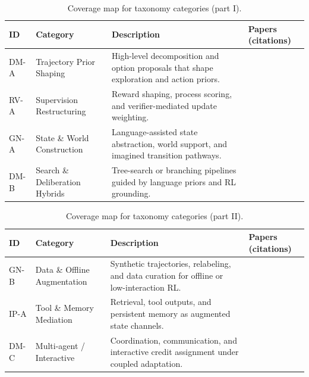 \documentclass[pdflatex,sn-mathphys-num]{sn-jnl}
\begin{document}
\begin{table}[t]
\centering
\footnotesize
\setlength{\tabcolsep}{4pt}
\renewcommand{\arraystretch}{1.05}
\begin{tabularx}{\textwidth}{P{1.1cm}P{2.6cm}P{3.4cm}Y}
\toprule
\textbf{ID} & \textbf{Category} & \textbf{Description} & \textbf{Papers (citations)}\\
\midrule
DM-A & Trajectory Prior Shaping & High-level decomposition and option proposals that shape exploration and action priors. & \cite{arxiv_p_2204_01691,arxiv_p_2305_16291,arxiv_p_2405_01534,arxiv_p_2512_12716,arxiv_p_2601_14140}\\
RV-A & Supervision Restructuring & Reward shaping, process scoring, and verifier-mediated update weighting. & \cite{arxiv_p_2310_12931,arxiv_p_2510_20867,arxiv_p_2602_12579}\\
GN-A & State \& World Construction & Language-assisted state abstraction, world support, and imagined transition pathways. & \cite{arxiv_p_2301_12050,arxiv_p_2303_16563,arxiv_p_2602_02454,arxiv_p_2602_11075,arxiv_p_2602_16165}\\
DM-B & Search \& Deliberation Hybrids & Tree-search or branching pipelines guided by language priors and RL grounding. & \cite{arxiv_p_2602_03719,arxiv_p_2602_06493,arxiv_p_2602_07848,doi_p_10_48448_q4pk_2g71}\\
\bottomrule
\end{tabularx}
\caption{Coverage map for taxonomy categories (part I).}
\label{tab:coverage_map_part1}
\end{table}

\begin{table}[t]
\centering
\footnotesize
\setlength{\tabcolsep}{4pt}
\renewcommand{\arraystretch}{1.05}
\begin{tabularx}{\textwidth}{P{1.1cm}P{2.6cm}P{3.4cm}Y}
\toprule
\textbf{ID} & \textbf{Category} & \textbf{Description} & \textbf{Papers (citations)}\\
\midrule
GN-B & Data \& Offline Augmentation & Synthetic trajectories, relabeling, and data curation for offline or low-interaction RL. & \cite{arxiv_p_2310_20587,arxiv_p_2505_18098,arxiv_p_2601_08107,arxiv_p_2602_03305}\\
IP-A & Tool \& Memory Mediation & Retrieval, tool outputs, and persistent memory as augmented state channels. & \cite{arxiv_p_2404_03648,arxiv_p_2511_14460,arxiv_p_2601_02439,arxiv_p_2601_07264,arxiv_p_2602_00994}\\
DM-C & Multi-agent / Interactive & Coordination, communication, and interactive credit assignment under coupled adaptation. & \cite{arxiv_p_2304_07297,arxiv_p_2310_03903,arxiv_p_2602_07848,arxiv_p_2602_08335}\\
\bottomrule
\end{tabularx}
\caption{Coverage map for taxonomy categories (part II).}
\label{tab:coverage_map_part2}
\end{table}
\end{document}
